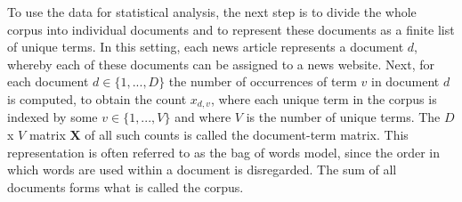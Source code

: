 \documentclass[12pt,a4paper,notitlepage]{article}
\begin{document}
To use the data for statistical analysis, the next step is to divide the whole corpus into individual documents and to represent these documents as a finite list of unique terms. In this setting, each news article represents a document $d$, whereby each of these documents can be assigned to a news website. Next, for each document $d \in \lbrace 1,...,D \rbrace$ the number of occurrences of term $v$ in document $d$ is computed, to obtain the count $x_{d,v}$, where each unique term in the corpus is indexed by some $v \in \lbrace 1,...,V \rbrace$ and where $V$ is the number of unique terms. The $D$ x $V$ matrix $\boldsymbol{X}$ of all such counts is called the document-term matrix. This representation is often referred to as the bag of words model, since the order in which words are used within a document is disregarded. The sum of all documents forms what is called the corpus.
\end{document}

